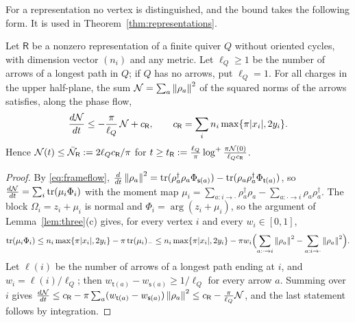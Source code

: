 For a representation no vertex is distinguished, and the bound takes the
following form. It is used in Theorem~\ref{thm:representations}.

\begin{proposition}[Representations]\label{prop:reparrows}
Let $\mathsf R$ be a nonzero representation of a finite quiver $Q$ without
oriented cycles, with dimension vector $(n_i)$ and any metric. Let $\ell_Q\geq1$ be
the number of arrows of a longest path in $Q$; if $Q$ has no arrows, put
$\ell_Q=1$. For all charges in the upper half-plane, the sum
$\mathcal N=\sum_a\left\lVert\rho_a\right\rVert^2$ of the squared norms of the arrows satisfies,
along the phase flow,
\[
 \frac{d\mathcal N}{dt}\leq-\frac\pi{\ell_Q}\,\mathcal N+c_{\mathsf R},\qquad
 c_{\mathsf R}=\sum_in_i\max\{\pi|x_i|,2y_i\}.
\]
Hence $\mathcal N(t)\leq\bar{\mathcal N}_{\mathsf R}:=2\ell_Qc_{\mathsf R}/\pi$ for
$t\geq t_{\mathsf R}:=\frac{\ell_Q}\pi\log^+\frac{\pi\mathcal N(0)}{\ell_Qc_{\mathsf R}}$.
\end{proposition}

\begin{proof}
By \eqref{eq:frameflow},
$\frac d{dt}\left\lVert\rho_a\right\rVert^2=\operatorname{tr}(\rho_a^\dagger\rho_a\Phi_{\mathsf s(a)})
-\operatorname{tr}(\rho_a\rho_a^\dagger\Phi_{\mathsf t(a)})$, so
$\frac{d\mathcal N}{dt}=\sum_i\operatorname{tr}(\mu_i\Phi_i)$ with the moment map
$\mu_i=\sum_{a:i\to\cdot}\rho_a^\dagger\rho_a-\sum_{a:\cdot\to i}\rho_a\rho_a^\dagger$.
The block $\Omega_i=z_i+\mu_i$ is normal and $\Phi_i=\arg(z_i+\mu_i)$, so the
argument of Lemma~\ref{lem:three}(c) gives, for every vertex $i$ and every
$w_i\in[0,1]$,
\[
 \operatorname{tr}(\mu_i\Phi_i)\leq n_i\max\{\pi|x_i|,2y_i\}-\pi\operatorname{tr}(\mu_i)_-
 \leq n_i\max\{\pi|x_i|,2y_i\}
 -\pi w_i\Bigl(\sum_{a:\cdot\to i}\left\lVert\rho_a\right\rVert^2-\sum_{a:i\to\cdot}\left\lVert\rho_a\right\rVert^2\Bigr).
\]
Let $\ell(i)$ be the number of arrows of a longest path ending at $i$, and
$w_i=\ell(i)/\ell_Q$; then $w_{\mathsf t(a)}-w_{\mathsf s(a)}\geq1/\ell_Q$ for
every arrow $a$. Summing over $i$ gives
$\frac{d\mathcal N}{dt}\leq c_{\mathsf R}-\pi\sum_a(w_{\mathsf t(a)}-w_{\mathsf s(a)})\left\lVert\rho_a\right\rVert^2
\leq c_{\mathsf R}-\frac\pi{\ell_Q}\mathcal N$, and the last statement follows by
integration.
\end{proof}
